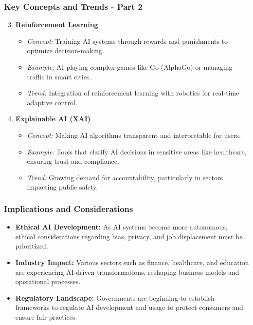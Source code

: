 \documentclass[aspectratio=169]{beamer}
\begin{document}
\begin{frame}[fragile]
    \frametitle{Key Concepts and Trends - Part 2}
    \begin{enumerate}
        \setcounter{enumi}{2} %
        \item \textbf{Reinforcement Learning}
        \begin{itemize}
            \item \textit{Concept:} Training AI systems through rewards and punishments to optimize decision-making.
            \item \textit{Example:} AI playing complex games like Go (AlphaGo) or managing traffic in smart cities.
            \item \textit{Trend:} Integration of reinforcement learning with robotics for real-time adaptive control.
        \end{itemize}

        \item \textbf{Explainable AI (XAI)}
        \begin{itemize}
            \item \textit{Concept:} Making AI algorithms transparent and interpretable for users.
            \item \textit{Example:} Tools that clarify AI decisions in sensitive areas like healthcare, ensuring trust and compliance.
            \item \textit{Trend:} Growing demand for accountability, particularly in sectors impacting public safety.
        \end{itemize}
    \end{enumerate}
\end{frame}

\begin{frame}[fragile]
    \frametitle{Implications and Considerations}
    \begin{itemize}
        \item \textbf{Ethical AI Development:} As AI systems become more autonomous, ethical considerations regarding bias, privacy, and job displacement must be prioritized.
        \item \textbf{Industry Impact:} Various sectors such as finance, healthcare, and education are experiencing AI-driven transformations, reshaping business models and operational processes.
        \item \textbf{Regulatory Landscape:} Governments are beginning to establish frameworks to regulate AI development and usage to protect consumers and ensure fair practices.
    \end{itemize}
\end{frame}
\end{document}
